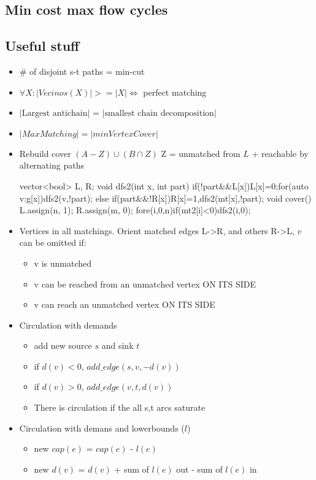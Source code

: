 \subsection{Min cost max flow cycles}

\subsection{Useful stuff}

\begin{itemize}
  \item \# of disjoint s-t paths = min-cut
  \item $\forall X: |Vecinos(X)| >= |X| \iff$ perfect matching
  \item $|\text{Largest antichain}|$ = $|\text{smallest chain decomposition}|$
  \item $|Max Matching| = |min Vertex Cover|$
  \item Rebuild cover $(A-Z)\cup(B\cap Z)$ Z = unmatched from $L$ + reachable by alternating paths
  \begin{code}
  vector<bool> L, R;
  void dfs2(int x, int part) {
    if(!part&&L[x]){L[x]=0;for(auto v:g[x])dfs2(v,!part);}
    else if(part&&!R[x])R[x]=1,dfs2(mt[x],!part);
  }
  void cover() {L.assign(n, 1); R.assign(m, 0);
    fore(i,0,n)if(mt2[i]<0)dfs2(i,0);
  }\end{code}
  \item Vertices in all matchings. Orient matched edges L->R, and others R->L, $v$ can be omitted if:
    \begin{itemize}
      \item v is unmatched
      \item v can be reached from an unmatched vertex ON ITS SIDE
      \item v can reach an unmatched vertex ON ITS SIDE
    \end{itemize}
  \item Circulation with demands
  \begin{itemize}
    \item add new source $s$ and sink $t$
    \item if $d(v) < 0$, $add\_edge(s, v, -d(v))$
    \item if $d(v) > 0$, $add\_edge(v, t, d(v))$
    \item There is circulation if the all s,t arcs saturate
  \end{itemize}
  \item Circulation with demans and lowerbounds ($l$)
  \begin{itemize}
    \item new $cap(e)$ = $cap(e)$ - $l(e)$
    \item new $d(v)$ = $d(v)$ + sum of $l(e)$ out - sum of $l(e)$ in
  \end{itemize}
\end{itemize}


